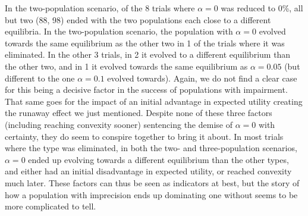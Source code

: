 \documentclass[a4paper]{article}
\begin{document}
In the two-population scenario, of the 8 trials where $\alpha = 0$ was reduced to 0\%, all but two (88, 98) ended with the two populations each close to a different equilibria.
In the two-population scenario, the population with $\alpha = 0$ evolved towards the same equilibrium as the other two in 1 of the trials where it was eliminated.
In the other 3 trials, in 2 it evolved to a different equilibrium than the other two, and in 1 it evolved towards the same equilibrium as $\alpha = 0.05$ (but different to the one $\alpha = 0.1$ evolved towards).
Again, we do not find a clear case for this being a decisive factor in the success of populations with impairment.
That same goes for the impact of an initial advantage in expected utility creating the runaway effect we just mentioned.
Despite none of these three factors (including reaching convexity sooner) sentencing the demise of $\alpha = 0$ with certainty, they do seem to conspire together to bring it about.
In most trials where the type was eliminated, in both the two- and three-population scenarios, $\alpha = 0$ ended up evolving towards a different equilibrium than the other types, and either had an initial disadvantage in expected utility, or reached convexity much later.
These factors can thus be seen as indicators at best, but the story of how a population with imprecision ends up dominating one without seems to be more complicated to tell.
\end{document}
